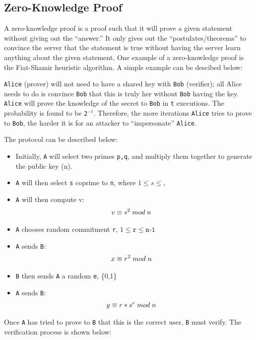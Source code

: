 \documentclass[10pt]{article}
\begin{document}
\subsection{Zero-Knowledge Proof}
A zero-knowledge proof is a proof such that it will prove a given statement
without giving out the ``answer.'' It only gives out the
``postulates/theorems'' to convince the server that the statement is true
without having the server learn anything about the given statement. One example
of a zero-knowledge proof is the Fiat-Shamir heuristic algorithm. A simple example
can be descibed below:

\texttt{Alice} (prover) will not need to have a shared key with \texttt{Bob}
(verifier); all Alice needs to do is convince \texttt{Bob} that this is truly
her without \texttt{Bob} having the key. \texttt{Alice} will prove the
knowledge of the secret to \texttt{Bob} in \texttt{t} executions. The
probability is found to be \texttt{2$^{-t}$}. Therefore, the more iterations
\texttt{Alice} tries to prove to \texttt{Bob}, the harder it is for an attacker
to ``impersonate'' \texttt{Alice}.

The protocol can be described below:
\begin{itemize}
    \item Initially, \texttt{A} will select two primes \texttt{p,q}, and multiply them together to generate the public key (n).
    \item \texttt{A} will then select \texttt{s} coprime to \texttt{n}, where $1 \leq s \leq$,
    \item \texttt{A} will then compute v:
        \begin{align*}
            v &\equiv s^{2} \thickspace mod \thickspace n
        \end{align*}
    \item \texttt{A} chooses random commitment \texttt{r}, $1 \leq \texttt{r} \leq \texttt{n-1}$
    \item \texttt{A} sends \texttt{B}:
        \begin{align*}
            x &\equiv r^{2} \thickspace mod \thickspace n
        \end{align*}
    \item \texttt{B} then sends \texttt{A} a random \texttt{e}, \{0,1\}
    \item \texttt{A} sends \texttt{B}:
        \begin{align*}
            y &\equiv r*s^{e} \thickspace mod \thickspace n
        \end{align*}
\end{itemize}
Once \texttt{A} has tried to prove to \texttt{B} that this is the correct user, \texttt{B} must verify.
The verification process is shown below:
\end{document}
